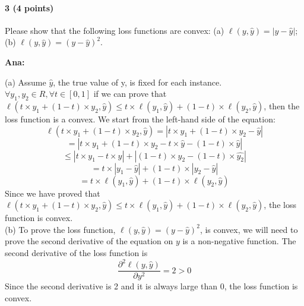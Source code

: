 \documentclass[11pt]{article}
\begin{document}
\paragraph{3 (4 points)} Please show that the following loss functions are convex: (a) $\ell (y, \hat{y}) = |y-\hat{y}|$; (b) $\ell (y, \hat{y}) = (y-\hat{y})^2$.

\noindent
\textbf{Ana:}

\noindent
(a) Assume $\hat{y}$, the true value of y, is fixed for each instance. $\forall y_1, y_2 \in R, \forall t \in [0,1]$ if we can prove that $\ell (t \times y_1 + (1-t) \times y_2, \hat{y}) \leq t \times \ell (y_1, \hat{y}) + (1-t) \times \ell (y_2, \hat{y})$,  then the loss function is a convex. We start from the left-hand side of the equation:
$$\ell (t \times y_1 + (1-t) \times y_2, \hat{y}) = | t \times y_1 + (1-t) \times y_2 - \hat{y} |$$
$$= | t \times y_1 + (1-t) \times y_2 - t \times \hat{y} - (1-t) \times \hat{y} |$$
$$\leq |t \times y_1 - t \times \hat{y}| + |(1-t) \times y_2 - (1-t) \times \hat{y_2}|$$
$$= t \times |y_1 - \hat{y}| + (1-t) \times |y_2 - \hat{y}|$$
$$= t \times \ell(y_1, \hat{y}) + (1-t) \times \ell(y_2, \hat{y})$$
Since we have proved that $\ell (t \times y_1 + (1-t) \times y_2, \hat{y}) \leq t \times \ell (y_1, \hat{y}) + (1-t) \times \ell (y_2, \hat{y})$, the loss function is convex.\\

\noindent
(b) To prove the loss function, $\ell (y, \hat{y}) = (y-\hat{y})^2$, is convex, we will need to prove the second derivative of the equation on $y$ is a non-negative function. 
The second derivative of the loss function is 
$$\frac{\partial^2 \ell(y, \hat{y})}{\partial y^2} = 2 > 0$$
Since the second derivative is 2 and it is always large than 0, the loss function is convex.



\end{document}

